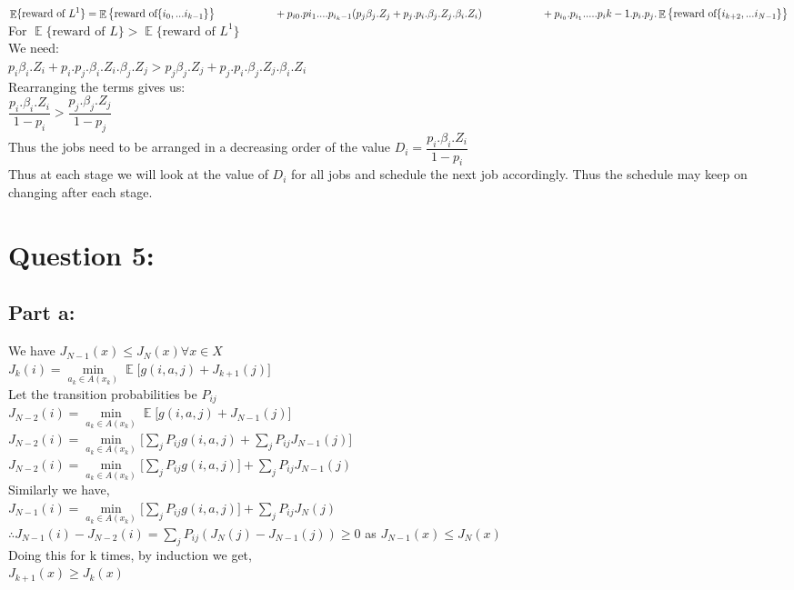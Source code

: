 \documentclass{article}
\newcommand\tab[1][1cm]{\hspace*{#1}}
\begin{document}
$\displaystyle \mathop{\mathbb{E}}\{\textrm{reward of } L^1\}=\displaystyle \mathop{\mathbb{E}} \big\{ \textrm{reward of} \{  i_0,...i_{k-1}    \}  \big\} \\ \tab \tab+   p_{i0}.p{i_1}....p_{i_k-1}(p_j\beta_j.Z_j+p_j.p_i.\beta_j.Z_j.\beta_i.Z_i)\\ \tab \tab+p_{i_0}.p_{i_1}.....p_i{k-1}.p_i.p_j.\displaystyle \mathop{\mathbb{E}} \big\{ \textrm{reward of} \{  i_{k+2},...i_{N-1}    \}  \big\}$\\
For $\displaystyle \mathop{\mathbb{E}}\{\textrm{reward of } L\} > \displaystyle \mathop{\mathbb{E}}\{\textrm{reward of } L^1\} $\\
We need:\\
$p_i\beta_i.Z_i+p_i.p_j.\beta_i.Z_i.\beta_j.Z_j > p_j\beta_j.Z_j+p_j.p_i.\beta_j.Z_j.\beta_i.Z_i$\\
Rearranging the terms gives us:\\
$\dfrac{p_i.\beta_i.Z_i}{1-p_i}>\dfrac{p_j.\beta_j.Z_j}{1-p_j}$\\
Thus the jobs need to be arranged in a decreasing order of the value $D_i=\dfrac{p_i.\beta_i.Z_i}{1-p_i}$\\
Thus at each stage we will look at the value of $D_i $ for all jobs and schedule the next job accordingly. Thus the schedule may keep on changing after each stage.

\section{Question 5:}

\subsection{Part a:}
We have $J_{N-1}(x) \leq J_N(x) \forall x \in X$\\
$J_k(i)=\min\limits_{a_k \in A(x_k)}\displaystyle \mathop{\mathbb{E}} \Big[ g(i,a,j)+J_{k+1}(j)\Big]$\\
Let the transition probabilities be $P_{ij}$\\
$J_{N-2}(i)=\min\limits_{a_k \in A(x_k)}\displaystyle \mathop{\mathbb{E}} \Big[ g(i,a,j)+J_{N-1}(j)\Big]$\\
$J_{N-2}(i)=\min\limits_{a_k \in A(x_k)}\Big[ \sum_{j}P_{ij} g(i,a,j)+\sum_{j}P_{ij}J_{N-1}(j)\Big]$\\
$J_{N-2}(i)=\min\limits_{a_k \in A(x_k)}\Big[ \sum_{j}P_{ij} g(i,a,j)\Big]+\sum_{j}P_{ij}J_{N-1}(j)$\\
Similarly we have,\\
$J_{N-1}(i)=\min\limits_{a_k \in A(x_k)}\Big[ \sum_{j}P_{ij} g(i,a,j)\Big]+\sum_{j}P_{ij}J_{N}(j)$\\
$\therefore J_{N-1}(i)-J_{N-2}(i)=\sum_{j}P_{ij}(J_N(j)-J_{N-1}(j)) \geq 0 $ as $ J_{N-1}(x) \leq J_N(x)$\\
Doing this for k times, by induction we get,\\
$J_{k+1}(x) \geq J_{k}(x)$\\
\end{document}
